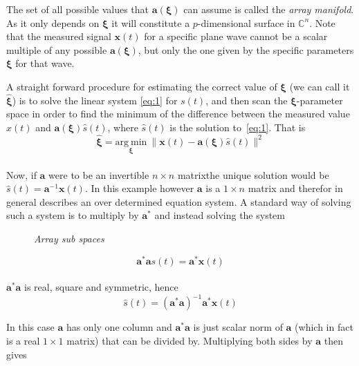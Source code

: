 \documentclass[11pt]{article}
\newcommand{\vct}[1]{\boldsymbol{#1}}
\begin{document}
The set of all possible values that $\vct{a}(\vct{\xi})$ can assume is called the \textit{array manifold}.
As it only depends on $\vct{\xi}$ it will constitute a $p$-dimensional surface in $\mathbb C^n$.
Note that the measured signal $\vct{x}(t)$ for a specific plane wave cannot be a scalar multiple of any possible $\vct{a}(\vct{\xi})$, but only the one given by the specific parameters $\vct{\xi}$ for that wave.

A straight forward procedure for estimating the correct value of $\vct{\xi}$ (we can call it $\hat{\vct{\xi}}$) is to solve the linear system \eqref{eq:1} for $s(t)$, and then scan the $\vct{\xi}$-parameter space in order to find the minimum of the difference between the measured value $x(t)$ and $\vct{a}(\vct{\xi})\hat{s}(t)$, where $\hat{s}(t)$ is the solution to~\eqref{eq:1}. That is
\begin{equation}\label{eq:2}
\hat{\vct{\xi}}=\underset{\vct{\xi}}{\mathrm{arg\ min}}\ \|\vct{x}(t) - \vct{a}(\vct{\xi})\hat{s}(t)\|^2
\end{equation}
\\
Now, if $\vct{a}$ were to be an invertible $n\times n$ matrix\footnotemark the unique solution would be $\hat{s}(t)=\vct{a}^{-1}\vct{x}(t)$.
In this example however $\vct{a}$ is a $1\times n$ matrix and therefor in general describes an over determined equation system.
A standard way of solving such a system is to multiply by $\vct{a}^*$ and instead solving the system

\begin{figure}[t]
    \def\svgwidth{250}
    
    \centering
    \caption{\textit{Array sub spaces}}
    \label{fig:subspace1dim}
\end{figure}

\begin{equation}
    \vct{a}^*\vct{a}s(t) = \vct{a}^*\vct{x}(t)
\end{equation}
\\
$\vct{a}^*\vct{a}$ is real, square and symmetric, hence
\begin{equation}
    \hat{s}(t) = (\vct{a}^*\vct{a})^{-1}\vct{a}^*\vct{x}(t)
\end{equation}

In this case $\vct{a}$ has only one column and $\vct{a}^*\vct{a}$ is just scalar norm of $\vct{a}$ (which in fact is a real $1\times 1$ matrix) that can be divided by.
Multiplying both sides by $\vct{a}$ then gives
\end{document}
